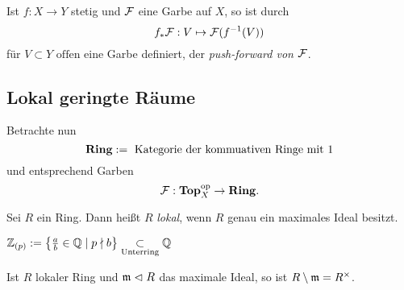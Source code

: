 \begin{definition}
	Ist $f:X \to Y$ stetig und $\mathcal{F}$ eine Garbe auf $X$, so ist durch
	\[ f_\ast \mathcal{F}: V \mapsto \mathcal{F}(f^{-1}(V))\]
	für $V\subset Y \text{ offen}$ eine Garbe definiert, 
	der \emph{push-forward von $\mathcal{F}$}.
\end{definition}



\subsection{Lokal geringte Räume}
Betrachte nun 
\[\mathbf{Ring} := \text{ Kategorie der kommuativen Ringe mit $1$}\]
und entsprechend Garben
\[\mathcal{F}:\mathbf{Top}_X^\mathrm{op} \to \mathbf{Ring}.\]

\begin{definition}
	Sei  $R$ ein Ring. Dann heißt $R$ \emph{lokal}, wenn $R$ genau ein
	maximales Ideal besitzt.
\end{definition}

\begin{beispiel}
	$\mathbb{Z}_{(p)} := \left\{\frac{a}{b} \in \mathbb{Q} \mid p \nmid b\right\}
  \underset{\text{Unterring}}{\subset}\mathbb{Q}$
\end{beispiel}

\begin{bemerkung}
	Ist $R$ lokaler Ring und $\mathfrak{m} \vartriangleleft R$ das maximale Ideal,
	so ist $R \setminus \mathfrak{m} = R^\times$.
\end{bemerkung}

